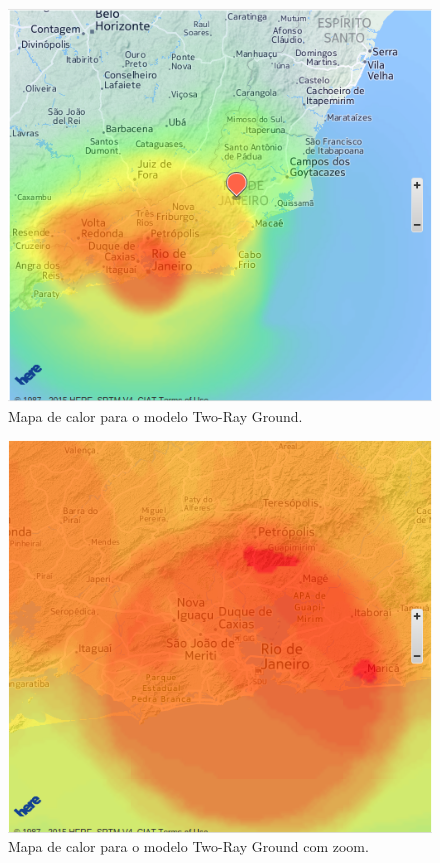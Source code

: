 \begin{figure}[htb]
\centering
\includegraphics[width=1.0\textwidth]{figs/tworayout}
\caption[Mapa de calor para o modelo Two-Ray Ground.]
{Mapa de calor para o modelo Two-Ray Ground.}
\label{fig:tworayout}
\end{figure} 

\begin{figure}[htb]
\centering
\includegraphics[width=1.0\textwidth]{figs/tworayin}
\caption[Mapa de calor para o modelo Two-Ray Ground com zoom.]
{Mapa de calor para o modelo Two-Ray Ground com zoom.}
\label{fig:tworayin}
\end{figure} 

